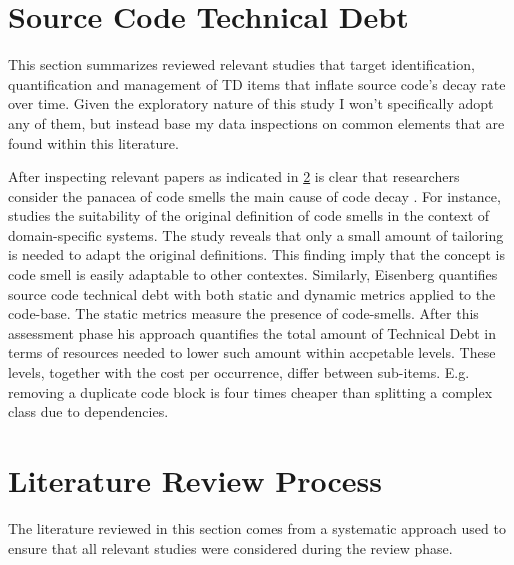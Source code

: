 \section{Source Code Technical Debt} \label{source_code_technical_debt}
This section summarizes reviewed relevant studies that target identification, quantification and management of TD items that inflate source code's decay rate over time. Given the exploratory nature of this study I won't specifically adopt any of them, but instead base my data inspections on common elements that are found within this literature.

After inspecting relevant papers as indicated in \ref{literature_review_process} is clear that researchers consider the panacea of code smells \cite{code_smell_definition} the main cause of code decay \cite{mapping_study_td}. For instance, \cite{domain_specific_code_smells} studies the suitability of the original definition of code smells in the context of domain-specific systems. The study reveals that only a small amount of tailoring is needed to adapt the original definitions. This finding imply that the concept is code smell is easily adaptable to other contextes. Similarly, Eisenberg \cite{threshold_approach_to_td} quantifies source code technical debt with both static and dynamic metrics applied to the code-base. The static metrics measure the presence of code-smells. After this assessment phase his approach quantifies the total amount of Technical Debt in terms of resources needed to lower such amount within accpetable levels. These levels, together with the cost per occurrence, differ between sub-items. E.g. removing a duplicate code block is four times cheaper than splitting a complex class due to dependencies.


\section{Literature Review Process} \label{literature_review_process}
The literature reviewed in this section comes from a systematic approach used to ensure that all relevant studies were considered during the review phase.

